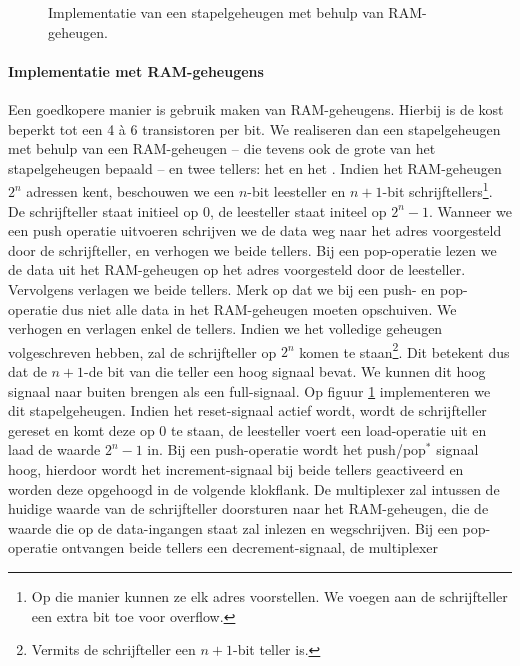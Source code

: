 \begin{figure}[hbt]
\caption{Implementatie van een stapelgeheugen met behulp van RAM-geheugen.}
\label{fig:stackImplRAM}
\end{figure}
\paragraph{Implementatie met RAM-geheugens}
Een goedkopere manier is gebruik maken van RAM-geheugens. Hierbij is de kost beperkt tot een 4 \`a 6 transistoren per bit. We realiseren dan een stapelgeheugen met behulp van een RAM-geheugen -- die tevens ook de grote van het stapelgeheugen bepaald -- en twee tellers: het  en het . Indien het RAM-geheugen $2^n$ adressen kent, beschouwen we een $n$-bit leesteller en $n+1$-bit schrijftellers\footnote{Op die manier kunnen ze elk adres voorstellen. We voegen aan de schrijfteller een extra bit toe voor overflow.}. De schrijfteller staat initieel op $0$, de leesteller staat initeel op $2^n-1$. Wanneer we een push operatie uitvoeren schrijven we de data weg naar het adres voorgesteld door de schrijfteller, en verhogen we beide tellers. Bij een pop-operatie lezen we de data uit het RAM-geheugen op het adres voorgesteld door de leesteller. Vervolgens verlagen we beide tellers. Merk op dat we bij een push- en pop-operatie dus niet alle data in het RAM-geheugen moeten opschuiven.
We verhogen en verlagen enkel de tellers. Indien we het volledige geheugen volgeschreven hebben, zal de schrijfteller op $2^n$ komen te staan\footnote{Vermits de schrijfteller een $n+1$-bit teller is.}. Dit betekent dus dat de $n+1$-de bit van die teller een hoog signaal bevat. We kunnen dit hoog signaal naar buiten brengen als een full-signaal. Op figuur \ref{fig:stackImplRAM} implementeren we dit stapelgeheugen. Indien het reset-signaal actief wordt, wordt de schrijfteller gereset en komt deze op 0 te staan, de leesteller voert een load-operatie uit en laad de waarde $2^n-1$ in. Bij een push-operatie wordt het push/pop$^*$ signaal hoog, hierdoor wordt het increment-signaal bij beide tellers geactiveerd en worden deze opgehoogd in de volgende klokflank. De multiplexer zal intussen de huidige waarde van de schrijfteller doorsturen naar het RAM-geheugen, die de waarde die op de data-ingangen staat zal inlezen en wegschrijven. Bij een pop-operatie ontvangen beide tellers een decrement-signaal, de multiplexer
